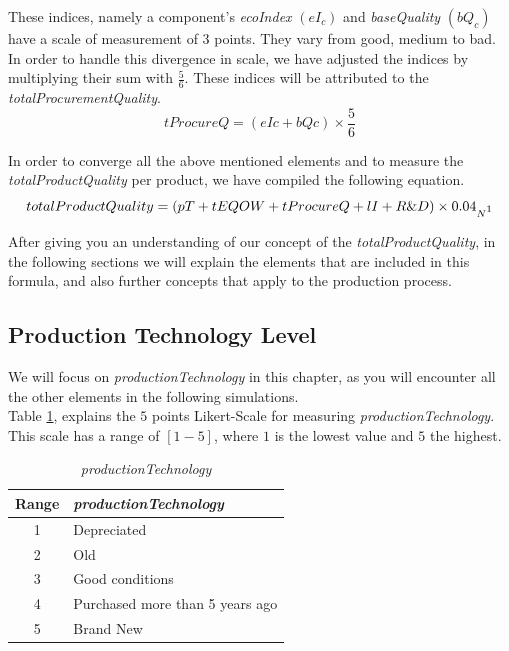 These indices, namely a component's \textit{ecoIndex} $(eI_{c})$ and \textit{baseQuality} $(bQ_{c})$ have a scale of measurement of $3$ points. They vary from good, medium to bad. In order to handle this divergence in scale, we have adjusted the indices by multiplying their sum with $\frac{5}{6}$. These indices will be attributed to the \textit{totalProcurementQuality}.
\begin{equation}
tProcureQ=(eIc + bQc)\times \frac{5}{6}
\end{equation}

In order to converge all the above mentioned elements and to measure the \textit{totalProductQuality} per product, we have compiled the following equation.
\begin{equation}
totalProductQuality = (pT+tEQOW+tProcureQ+lI+R\&D) \times 0.04_{N\footnotemark}
\label{eq:PQ}
\end{equation}
 
After giving you an understanding of our concept of the \textit{totalProductQuality}, in the following sections we will explain the elements that  are included in this formula, and also further concepts that apply to the production process.

\subsection{Production Technology Level}
We will focus on \textit{productionTechnology} in this chapter, as you will encounter all the other elements in the following simulations. \\
Table \ref{table:my-label}, explains the $5$ points Likert-Scale for measuring \textit{productionTechnology}. This scale has a range of $[1-5]$, where $1$ is the lowest value and $5$ the highest.

\begin{table}[ht]
\centering
\begin{tabular}{|c|l|}
\hline
 Range & \textit{productionTechnology}\\
\hline
 1 & Depreciated  \\
 2 & Old \\
 3 & Good conditions \\
 4 & Purchased more than 5 years ago  \\
 5 & Brand New\\
\hline
\end{tabular}
\caption{\textit{productionTechnology}}
\label{table:my-label}
\end{table}

